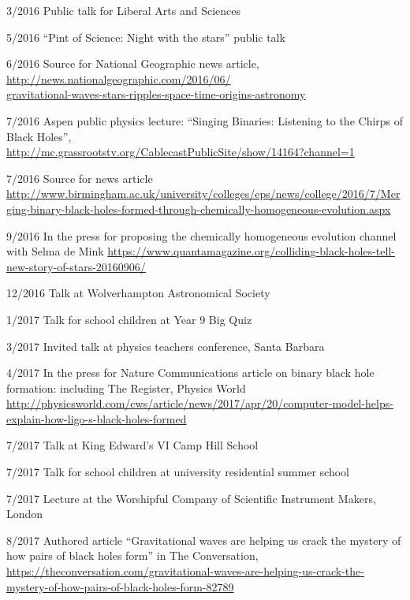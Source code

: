\documentclass[margin,line]{res}
\begin{document}
\begin{resume}
3/2016	Public talk for Liberal Arts and Sciences 

5/2016	``Pint of Science: Night with the stars'' public talk

6/2016	Source for National Geographic news article,\\ \url{http://news.nationalgeographic.com/2016/06/}\\\url{gravitational-waves-stars-ripples-space-time-origins-astronomy}

7/2016	Aspen public physics lecture: ``Singing Binaries: Listening to the Chirps of Black Holes'',\\\url{http://mc.grassrootstv.org/CablecastPublicSite/show/14164?channel=1}

7/2016 	Source for news article\\ \url{http://www.birmingham.ac.uk/university/colleges/eps/news/college/2016/7/Merging-binary-black-holes-formed-through-chemically-homogeneous-evolution.aspx}

9/2016 	In the press for proposing the chemically homogeneous evolution channel with Selma de Mink \url{https://www.quantamagazine.org/colliding-black-holes-tell-new-story-of-stars-20160906/}

12/2016	Talk at Wolverhampton Astronomical Society

1/2017	Talk for school children at Year 9 Big Quiz

3/2017	Invited talk at physics teachers conference, Santa Barbara

4/2017	In the press for Nature Communications article on binary black hole formation: including The Register, %
Physics World\\ \url{http://physicsworld.com/cws/article/news/2017/apr/20/computer-model-helps-explain-how-ligo-s-black-holes-formed}

7/2017	Talk at King Edward's VI Camp Hill School

7/2017	Talk for school children at university residential summer school

7/2017 	Lecture at the Worshipful Company of Scientific Instrument Makers, London

8/2017	Authored article ``Gravitational waves are helping us crack the mystery of how pairs of black holes form'' in The Conversation,\\ 
\url{https://theconversation.com/gravitational-waves-are-helping-us-crack-the-mystery-of-how-pairs-of-black-holes-form-82789}


\end{resume}
\end{document}
